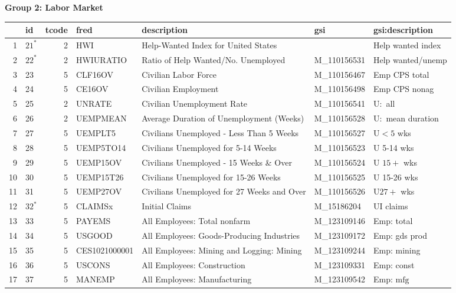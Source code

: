 \begin{landscape}
\begin{singlespace}
\begin{center}
   \textbf{Group 2: Labor Market}
\end{center}


\begin{longtable}{rlrllll}
\hline & id & tcode & fred & description & gsi & gsi:description \\
\hline 1 & $21^{*}$ & 2 & HWI & Help-Wanted Index for United States & & Help wanted index \\
 2 & $22^{*}$ & 2 & HWIURATIO & Ratio of Help Wanted/No. Unemployed & M\_110156531 & Help wanted/unemp \\
 3 & 23 & 5 & CLF16OV & Civilian Labor Force & M\_110156467 & Emp CPS total \\
 4 & 24 & 5 & CE16OV & Civilian Employment & M\_110156498 & Emp CPS nonag \\
 5 & 25 & 2 & UNRATE & Civilian Unemployment Rate & M\_110156541 & $\mathrm{U}:$ all \\
 6 & 26 & 2 & UEMPMEAN & Average Duration of Unemployment (Weeks) & M\_110156528 & $\mathrm{U}:$ mean duration \\
 7 & 27 & 5 & UEMPLT5 & Civilians Unemployed - Less Than 5 Weeks & M\_110156527 & $\mathrm{U}<5$ wks \\
 8 & 28 & 5 & UEMP5TO14 & Civilians Unemployed for 5-14 Weeks & M\_110156523 & U 5-14 wks \\
 9 & 29 & 5 & UEMP15OV & Civilians Unemployed - 15 Weeks \& Over & M\_110156524 & U $15+$ wks \\
 10 & 30 & 5 & UEMP15T26 & Civilians Unemployed for 15-26 Weeks & M\_110156525 & U 15-26 wks \\
 11 & 31 & 5 & UEMP27OV & Civilians Unemployed for 27 Weeks and Over & M\_110156526 & $\mathrm{U} 27+$ wks \\
 12 & $32^{*}$ & 5 & CLAIMSx & Initial Claims & M\_15186204 & UI claims \\
 13 & 33 & 5 & PAYEMS & All Employees: Total nonfarm & M\_123109146 & Emp: total \\
 14 & 34 & 5 & USGOOD & All Employees: Goods-Producing Industries & M\_123109172 & Emp: gds prod \\
 15 & 35 & 5 & CES1021000001 & All Employees: Mining and Logging: Mining & M\_123109244 & Emp: mining \\
 16 & 36 & 5 & USCONS & All Employees: Construction & M\_123109331 & Emp: const \\
 17 & 37 & 5 & MANEMP & All Employees: Manufacturing & M\_123109542 & Emp: $\mathrm{mfg}$ \\

\end{longtable}
\end{singlespace}
\end{landscape}
